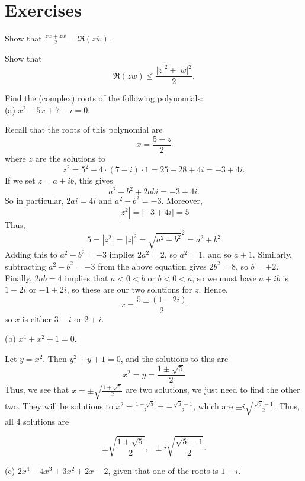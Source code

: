 \documentclass[11pt,dvipsnames]{book}
\numberwithin{equation}{section} %
\numberwithin{figure}{section} %
\numberwithin{table}{section} %
\begin{document}
\section{Exercises}



\begin{exercise} Show that $\frac{z\overline{w}+\overline{z}w}{2} = \Re(z\overline{w})$. 

\end{exercise}

\begin{exercise} Show that 
\[
\Re(zw)\leq \frac{|z|^2+|w|^2}{2}.
\]


\end{exercise}



\begin{exercise} Find the (complex) roots of the following polynomials:\\

(a) $x^2-5x+7-i=0$. 

\begin{solution}

Recall that the roots of this polynomial are 
\[
x= \frac{5\pm z}{2}
\]
where $z$ are the solutions to 
\[
z^2 = 5^2-4\cdot (7-i)\cdot 1  = 25-28+4i = -3+4i.
\]
If we set $z=a+ib$, this gives
\[
a^2-b^2+2abi = -3+4i.
\]
So in particular, $2ai = 4i$ and $a^2-b^2 = -3$. Moreover, 
\[
|z^2|= |-3 + 4i| = 5
\]
Thus, 
\[
5=|z^2|=|z|^2 = \sqrt{a^2+b^2}^2 = a^2+b^2
\]
Adding this to  $a^2-b^2=-3$ implies $2a^2 = 2$, so $a^2=1$, and so $a\pm 1$. Similarly, subtracting $a^2-b^2=-3$ from the above equation gives $2b^2 = 8$, so $b=\pm 2$. Finally, $2ab = 4$ implies that $a<0<b$ or $b<0<a$, so we must have $a+ib$ is $1-2i$ or $-1+2i$, so these are our two solutions for $z$. Hence,
\[
x=\frac{5 \pm (1-2i)}{2} \]
so $x$ is either $3-i$ or $2+i$. 

\end{solution}




(b)  $ x^4 + x^2 + 1 = 0$.

\begin{solution}
Let $y=x^2$. Then $y^2+y+1=0$, and the solutions to this are
\[
x^2=y=\frac{1\pm \sqrt{5}}{2} 
\]
Thus, we see that $x=\pm \sqrt{\frac{1+\sqrt{5}}{2}}$ are two solutions, we just need to find the other two. They will be solutions to $x^2 = \frac{1-\sqrt{5}}{2} = - \frac{\sqrt{5}-1}{2}$, which are $\pm i \sqrt{\frac{\sqrt{5}-1}{2}}$. Thus, all 4 solutions are 

\[
\pm \sqrt{\frac{1+\sqrt{5}}{2}}, \;\; \pm i \sqrt{\frac{\sqrt{5}-1}{2}}.
\]



\end{solution}


(c) $2x^4-4x^3+3x^2+2x-2$, given that one of the roots is $1+i$.


\end{exercise}
\end{document}
